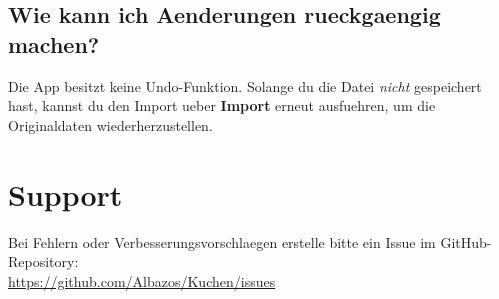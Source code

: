 \documentclass[12pt, a4paper]{article}
\begin{document}
\subsection{Wie kann ich Aenderungen rueckgaengig machen?}
Die App besitzt keine Undo-Funktion. Solange du die Datei \emph{nicht}
gespeichert hast, kannst du den Import ueber \textbf{Import} erneut ausfuehren,
um die Originaldaten wiederherzustellen.

\section{Support}

Bei Fehlern oder Verbesserungsvorschlaegen erstelle bitte ein Issue im
GitHub-Repository:\\
\url{https://github.com/Albazos/Kuchen/issues}
\end{document}
